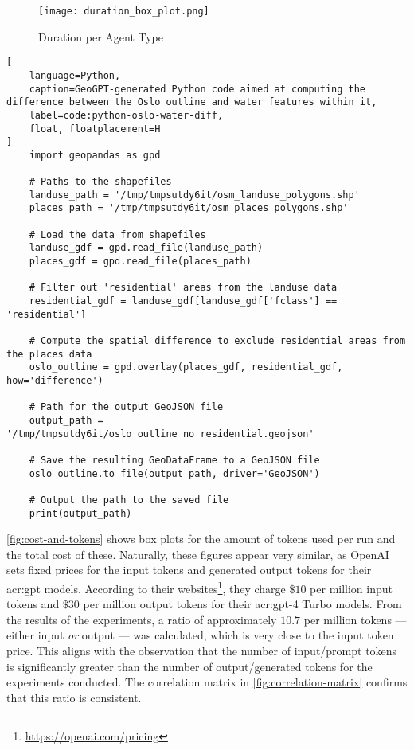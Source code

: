 \begin{figure}[htbp]
    \centering
    \texttt{[image: duration\_box\_plot.png]}
    \caption{Duration per Agent Type}
    \label{fig:duration-box-plot}
\end{figure}

\begin{lstlisting}[
    language=Python,
    caption=GeoGPT-generated Python code aimed at computing the difference between the Oslo outline and water features within it,
    label=code:python-oslo-water-diff,
    float, floatplacement=H
]
    import geopandas as gpd

    # Paths to the shapefiles
    landuse_path = '/tmp/tmpsutdy6it/osm_landuse_polygons.shp'
    places_path = '/tmp/tmpsutdy6it/osm_places_polygons.shp'
    
    # Load the data from shapefiles
    landuse_gdf = gpd.read_file(landuse_path)
    places_gdf = gpd.read_file(places_path)
    
    # Filter out 'residential' areas from the landuse data
    residential_gdf = landuse_gdf[landuse_gdf['fclass'] == 'residential']
     
    # Compute the spatial difference to exclude residential areas from the places data
    oslo_outline = gpd.overlay(places_gdf, residential_gdf, how='difference')
    
    # Path for the output GeoJSON file
    output_path = '/tmp/tmpsutdy6it/oslo_outline_no_residential.geojson'
    
    # Save the resulting GeoDataFrame to a GeoJSON file
    oslo_outline.to_file(output_path, driver='GeoJSON')
    
    # Output the path to the saved file
    print(output_path)    
\end{lstlisting}

\autoref{fig:cost-and-tokens} shows box plots for the amount of tokens used per run and the total cost of these. Naturally, these figures appear very similar, as OpenAI sets fixed prices for the input tokens and generated output tokens for their \acrshort{acr:gpt} models. According to their websites\footnote{\url{https://openai.com/pricing}}, they charge $\$10$ per million input tokens and $\$30$ per million output tokens for their \acrshort{acr:gpt}-4 Turbo models. From the results of the experiments, a ratio of approximately $10.7$ per million tokens --- either input \textit{or} output --- was calculated, which is very close to the input token price. This aligns with the observation that the number of input/prompt tokens is significantly greater than the number of output/generated tokens for the experiments conducted. The correlation matrix in \autoref{fig:correlation-matrix} confirms that this ratio is consistent.

